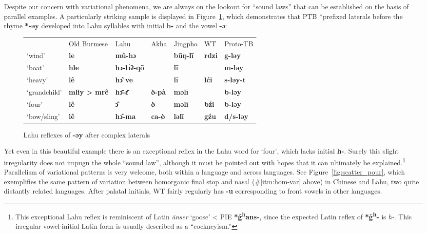 Despite our concern with variational phenomena, we are always on the lookout for “sound laws” that can be established on the basis of parallel examples. A particularly striking sample is displayed in Figure~\ref{fig:Lahu_əy}, which demonstrates that PTB *prefixed laterals before the rhyme \textbf{*-əy} developed into Lahu syllables with initial \textbf{h-} and the vowel \textbf{-ɔ}:

\begin{figure}[h!]
\begin{tabular}{l l l l l l l}
 & Old Burmese & Lahu & Akha & Jingpho & WT & Proto-TB\\
‘wind’ & \textbf{le} & \textbf{mû-hɔ} & \textbf{} & \textbf{būŋ-lī} & \textbf{rdzi} & \textbf{g-ləy}\\
‘boat’ & \textbf{hle} & \textbf{hɔ-lɔ̀ʔ-qō} & \textbf{} & \textbf{lī} & \textbf{} & \textbf{m-ləy}\\
‘heavy’ & \textbf{lê} & \textbf{hɔ̂ ve} & \textbf{} & \textbf{lī} & \textbf{lći} & \textbf{s-ləy-t}\\
‘grandchild’ & \textbf{mliy > mrê} & \textbf{hɔ̄-ɛ̄} & \textbf{ø̀-pà} & \textbf{məlī} & \textbf{} & \textbf{b-ləy}\\
‘four’ & \textbf{lê} & \textbf{ɔ̂} & \textbf{ø̀} & \textbf{məlī} & \textbf{bźi} & \textbf{b-ləy}\\
‘bow/sling’ & \textbf{lê} & \textbf{hɔ̂-ma} & \textbf{ca-ø̀} & \textbf{ləlī} & \textbf{gźu} & \textbf{d/s-ləy}\\
\end{tabular}
\caption{Lahu reflexes of \textbf{-əy} after complex laterals}
\label{fig:Lahu_əy}
\end{figure}

Yet even in this beautiful example there is an exceptional reflex in the Lahu word for ‘four’, which lacks initial \textbf{h-}. Surely this 
slight irregularity does not impugn the whole “sound law”, although it must be pointed out with hopes that it can ultimately be 
explained.\footnote{This exceptional Lahu reflex is reminiscent of Latin \textit{\=anser} ‘goose’ < PIE \textbf{*\'g\textsuperscript{h}ans-}, 
since the expected Latin reflex of \textbf{*\'g\textsuperscript{h}-} is \textit{h-}. This irregular vowel-initial Latin form is usually described as a “cockneyism.”
} Parallelism of variational patterns is very welcome, both within a language and across languages. See Figure~\ref{fig:scatter_pour}, which 
exemplifies the same pattern of variation between homorganic final stop and nasal (\#\ref{itm:hom-var} above) in Chinese and Lahu, two quite 
distantly related languages. After palatal initials, WT fairly regularly has \textbf{-u} corresponding to front vowels in other languages.

